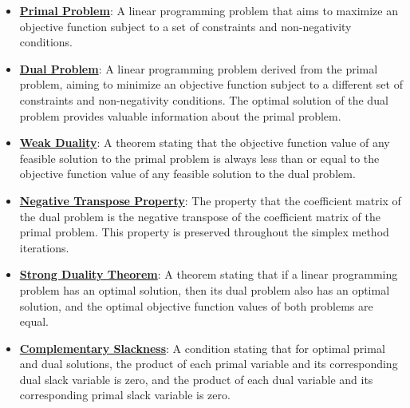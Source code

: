 \documentclass{article}%
\begin{document}
\begin{itemize}[leftmargin=*]%
\item \href{https://www.math.purdue.edu/~yipn/421/2024-09-12-Duality.pdf#page=1}{\textbf{Primal Problem}}: A linear programming problem that aims to maximize an objective function subject to a set of constraints and non-negativity conditions.%
\item \href{https://www.math.purdue.edu/~yipn/421/2024-09-12-Duality.pdf#page=1}{\textbf{Dual Problem}}: A linear programming problem derived from the primal problem, aiming to minimize an objective function subject to a different set of constraints and non-negativity conditions. The optimal solution of the dual problem provides valuable information about the primal problem.%
\item \href{https://www.math.purdue.edu/~yipn/421/2024-09-12-Duality.pdf#page=2}{\textbf{Weak Duality}}: A theorem stating that the objective function value of any feasible solution to the primal problem is always less than or equal to the objective function value of any feasible solution to the dual problem.%
\item \href{https://www.math.purdue.edu/~yipn/421/2024-09-12-Duality.pdf#page=6}{\textbf{Negative Transpose Property}}: The property that the coefficient matrix of the dual problem is the negative transpose of the coefficient matrix of the primal problem. This property is preserved throughout the simplex method iterations.%
\item \href{https://www.math.purdue.edu/~yipn/421/2024-09-12-Duality.pdf#page=11}{\textbf{Strong Duality Theorem}}: A theorem stating that if a linear programming problem has an optimal solution, then its dual problem also has an optimal solution, and the optimal objective function values of both problems are equal.%
\item \href{https://www.math.purdue.edu/~yipn/421/2024-09-12-Duality.pdf#page=5}{\textbf{Complementary Slackness}}: A condition stating that for optimal primal and dual solutions, the product of each primal variable and its corresponding dual slack variable is zero, and the product of each dual variable and its corresponding primal slack variable is zero.%
\end{itemize}%
\end{document}
